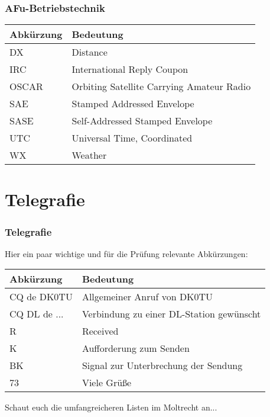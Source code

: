 \begin{frame}
  \frametitle{AFu-Betriebstechnik}

  \begin{center}
    \footnotesize
    \begin{tabular}{|l|l|}\hline
      \textbf{Abkürzung} & \textbf{Bedeutung}                         \\ \hline \hline
      DX    & Distance                                                \\ \hline
      IRC   & International Reply Coupon                              \\ \hline
      OSCAR & Orbiting Satellite Carrying Amateur Radio               \\ \hline
      SAE   & Stamped Addressed Envelope                              \\ \hline
      SASE  & Self-Addressed Stamped Envelope                         \\ \hline
      UTC   & Universal Time, Coordinated                             \\ \hline
      WX    & Weather                                                 \\ \hline
    \end{tabular}
  \end{center}

\end{frame}

\section*{Telegrafie}

\begin{frame}
  \frametitle{Telegrafie}

  Hier ein paar wichtige und für die Prüfung relevante Abkürzungen:

  \begin{center}
    \footnotesize
    \begin{tabular}{|l|l|}\hline
      \textbf{Abkürzung} & \textbf{Bedeutung}                         \\ \hline \hline
      CQ de DK0TU & Allgemeiner Anruf von DK0TU                       \\ \hline
      CQ DL de ...& Verbindung zu einer DL-Station gewünscht          \\ \hline
      R           & Received                                          \\ \hline
      K           & Aufforderung zum Senden                           \\ \hline
      BK          & Signal zur Unterbrechung der Sendung              \\ \hline
      73          & Viele Grüße                                       \\ \hline
    \end{tabular}
  \end{center}

  Schaut euch die umfangreicheren Listen im Moltrecht an...

\end{frame}

